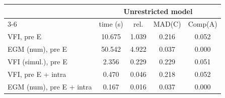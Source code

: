 \begin{tabular}{llcccc} \toprule
&& \multicolumn{4}{c}{Unrestricted model}  \\ 
 \cmidrule(lr){3-6} && time (s) & rel. & MAD(C)  & Comp(A) \\ \midrule 
\multicolumn{2}{l}{VFI, pre E} & 10.675 & 1.039 & 0.216 & 0.052 \\ 
\multicolumn{2}{l}{EGM (num), pre E} & 50.542 & 4.922 & 0.037 & 0.000 \\ 
\multicolumn{2}{l}{VFI (simul.), pre E} & 2.356 & 0.229 & 0.229 & 0.051 \\ 
\multicolumn{2}{l}{VFI, pre E + intra} & 0.470 & 0.046 & 0.218 & 0.052 \\ 
\multicolumn{2}{l}{EGM (num), pre E + intra} & 0.167 & 0.016 & 0.037 & 0.000 \\ 
\bottomrule \end{tabular}
